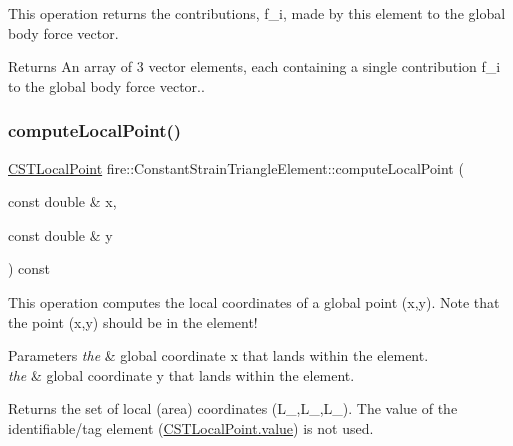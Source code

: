 This operation returns the contributions, f\+\_\+i, made by this element to the global body force vector. \begin{DoxyReturn}{Returns}
An array of 3 vector elements, each containing a single contribution f\+\_\+i to the global body force vector.. 
\end{DoxyReturn}
\mbox{\label{a00789_a772e106e996b0d757332ca59b9c7f159}} 
\subsubsection{\texorpdfstring{compute\+Local\+Point()}{computeLocalPoint()}}
{\footnotesize\ttfamily \hyperlink{a00210_a124b14f4255dab47a3f7235a02cc65ee}{C\+S\+T\+Local\+Point} fire\+::\+Constant\+Strain\+Triangle\+Element\+::compute\+Local\+Point (\begin{DoxyParamCaption}\item[{const double \&}]{x,  }\item[{const double \&}]{y }\end{DoxyParamCaption}) const}

This operation computes the local coordinates of a global point (x,y). Note that the point (x,y) should be in the element! 
\begin{DoxyParams}{Parameters}
{\em the} & global coordinate x that lands within the element. \\
\hline
{\em the} & global coordinate y that lands within the element. \\
\hline
\end{DoxyParams}
\begin{DoxyReturn}{Returns}
the set of local (area) coordinates (L\+\_,L\+\_,L\+\_). The value of the identifiable/tag element (\hyperlink{a00797_a4aa238990585cb35d1902140ebe6fb9f}{C\+S\+T\+Local\+Point.\+value}) is not used. 
\end{DoxyReturn}
\mbox{\label{a00789_aaec00b05b8a6af567d2f5b39b1bb5611}} 

